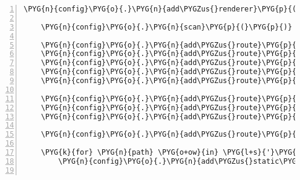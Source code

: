 \begin{Verbatim}[commandchars=\\\{\},numbers=left,firstnumber=1,stepnumber=5]
    \PYG{n}{config}\PYG{o}{.}\PYG{n}{add\PYGZus{}renderer}\PYG{p}{(}\PYG{l+s}{'}\PYG{l+s}{jsonx}\PYG{l+s}{'}\PYG{p}{,} \PYG{n}{jsonx}\PYG{p}{)}

    \PYG{n}{config}\PYG{o}{.}\PYG{n}{scan}\PYG{p}{(}\PYG{p}{)}

    \PYG{n}{config}\PYG{o}{.}\PYG{n}{add\PYGZus{}route}\PYG{p}{(}\PYG{l+s}{'}\PYG{l+s}{home}\PYG{l+s}{'}\PYG{p}{,} \PYG{l+s}{'}\PYG{l+s}{/}\PYG{l+s}{'}\PYG{p}{)}
    \PYG{n}{config}\PYG{o}{.}\PYG{n}{add\PYGZus{}route}\PYG{p}{(}\PYG{l+s}{'}\PYG{l+s}{upload}\PYG{l+s}{'}\PYG{p}{,} \PYG{l+s}{'}\PYG{l+s}{/upload}\PYG{l+s}{'}\PYG{p}{)}
    \PYG{n}{config}\PYG{o}{.}\PYG{n}{add\PYGZus{}route}\PYG{p}{(}\PYG{l+s}{'}\PYG{l+s}{analyses}\PYG{l+s}{'}\PYG{p}{,} \PYG{l+s}{'}\PYG{l+s}{/analyses}\PYG{l+s}{'}\PYG{p}{)}
    \PYG{n}{config}\PYG{o}{.}\PYG{n}{add\PYGZus{}route}\PYG{p}{(}\PYG{l+s}{'}\PYG{l+s}{analysis}\PYG{l+s}{'}\PYG{p}{,} \PYG{l+s}{'}\PYG{l+s}{/analyses/\PYGZob{}id\PYGZcb{}}\PYG{l+s}{'}\PYG{p}{)}
    \PYG{n}{config}\PYG{o}{.}\PYG{n}{add\PYGZus{}route}\PYG{p}{(}\PYG{l+s}{'}\PYG{l+s}{analysis\PYGZus{}files}\PYG{l+s}{'}\PYG{p}{,} \PYG{l+s}{'}\PYG{l+s}{/analyses/\PYGZob{}id\PYGZcb{}/files*subpath}\PYG{l+s}{'}\PYG{p}{)}

    \PYG{n}{config}\PYG{o}{.}\PYG{n}{add\PYGZus{}route}\PYG{p}{(}\PYG{l+s}{'}\PYG{l+s}{analysis\PYGZus{}rest}\PYG{l+s}{'}\PYG{p}{,} \PYG{l+s}{'}\PYG{l+s}{/rest/analyses/\PYGZob{}id\PYGZcb{}}\PYG{l+s}{'}\PYG{p}{)}
    \PYG{n}{config}\PYG{o}{.}\PYG{n}{add\PYGZus{}route}\PYG{p}{(}\PYG{l+s}{'}\PYG{l+s}{analysis\PYGZus{}logs\PYGZus{}rest}\PYG{l+s}{'}\PYG{p}{,} \PYG{l+s}{'}\PYG{l+s}{/rest/analyses/\PYGZob{}id\PYGZcb{}/logs}\PYG{l+s}{'}\PYG{p}{)}
    \PYG{n}{config}\PYG{o}{.}\PYG{n}{add\PYGZus{}route}\PYG{p}{(}\PYG{l+s}{'}\PYG{l+s}{analysis\PYGZus{}files\PYGZus{}rest}\PYG{l+s}{'}\PYG{p}{,} \PYG{l+s}{'}\PYG{l+s}{/rest/analyses/\PYGZob{}id\PYGZcb{}/files}\PYG{l+s}{'}\PYG{p}{)}

    \PYG{n}{config}\PYG{o}{.}\PYG{n}{add\PYGZus{}route}\PYG{p}{(}\PYG{l+s}{'}\PYG{l+s}{organisms\PYGZus{}rest}\PYG{l+s}{'}\PYG{p}{,} \PYG{l+s}{'}\PYG{l+s}{/rest/organisms}\PYG{l+s}{'}\PYG{p}{)}

    \PYG{k}{for} \PYG{n}{path} \PYG{o+ow}{in} \PYG{l+s}{'}\PYG{l+s}{less}\PYG{l+s}{'}\PYG{p}{,} \PYG{l+s}{'}\PYG{l+s}{css}\PYG{l+s}{'}\PYG{p}{,} \PYG{l+s}{'}\PYG{l+s}{img}\PYG{l+s}{'}\PYG{p}{,} \PYG{l+s}{'}\PYG{l+s}{js}\PYG{l+s}{'}\PYG{p}{:}
        \PYG{n}{config}\PYG{o}{.}\PYG{n}{add\PYGZus{}static\PYGZus{}view}\PYG{p}{(}\PYG{n}{path}\PYG{p}{,} \PYG{n}{path}\PYG{p}{)}


\end{Verbatim}
